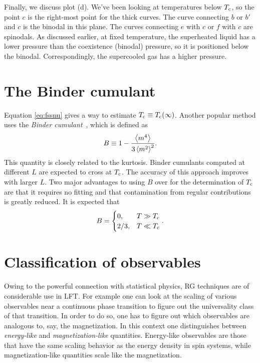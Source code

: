 Finally, we discuss plot (d). We've been looking at temperatures below $T_{\rm c}$, so
the point $c$ is the right-most point for the thick curves. The curve connecting
$b$ or $b'$ and $c$ is the binodal in this plane. The curves connecting $e$ with
$c$ or $f$ with $c$ are spinodals. As discussed earlier, at fixed temperature,
the superheated liquid has a lower pressure than the coexistence (binodal)
pressure, so it is positioned below the binodal. Correspondingly, the
supercooled gas has a higher pressure.

\section{The Binder cumulant}\label{sec:binder} 

Equation \eqref{eq:fssnu} gives a way to estimate $T_{\rm c}\equiv T_{\rm c}(\infty)$.
Another popular method uses the
{\it Binder cumulant}~\cite{binder_finite_1981,binder_critical_1981}, which is defined as
\begin{equation}
B\equiv1-\frac{\ev{m^4}}{3\ev{m^2}^2}.
\end{equation}
This quantity is closely related to the kurtosis. Binder cumulants computed at
different $L$ are expected to cross at $T_{\rm c}$. The accuracy of this approach
improves with larger $L$. Two major advantages to using $B$ over
 for the determination of $T_{\rm c}$ are that it requires no
fitting and that contamination from regular contributions is greatly reduced.
It is expected that
\begin{equation}
B=\begin{cases} 
    0, & T\gg T_{\rm c}\\ 
    2/3, & T\ll T_{\rm c} 
\end{cases}.
\end{equation}

\section{Classification of observables}


Owing to the powerful connection with statistical physics, RG techniques are of
considerable use in LFT. For example one can look at the scaling of various
observables near a continuous phase transition to figure out the universality
class of that transition. In order to do so, one has to figure out which
observables are analogous to, say, the magnetization. In this context one
distinguishes between {\it energy-like} and {\it
magnetization-like} quantities. Energy-like
observables are those that have the same scaling behavior as the energy density
in spin systems, while magnetization-like quantities scale like the
magnetization.

